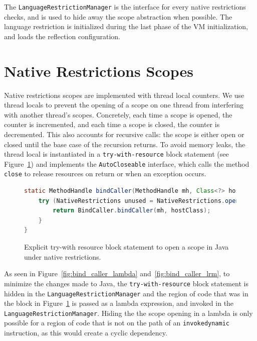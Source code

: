 The \verb|LanguageRestrictionManager| is the interface for every native restrictions checks, and is used to hide away the scope abstraction when possible.
The language restriction is initialized during the last phase of the VM initialization, and loads the reflection configuration.
\section{Native Restrictions Scopes}
Native restrictions scopes are implemented with thread local counters. We use thread locals to prevent the opening of a scope on one thread from interfering with another thread's scopes.
Concretely, each time a scope is opened, the counter is incremented, and each time a scope is closed, the counter is decremented. This also accounts for recursive calls: the scope is either open or closed until the base case of the recursion returns.
To avoid memory leaks, the thread local is instantiated in a \verb|try-with-resource| block statement (see Figure~\ref{fig:bind_caller_twr}) and implements the \verb|AutoCloseable| interface, which calls the method \verb|close| to release resources on return or when an exception occurs.

\begin{figure}[ht]
    \centering
\begin{lstlisting}[language=Java]
static MethodHandle bindCaller(MethodHandle mh, Class<?> hostClass) {
    try (NativeRestrictions unused = NativeRestrictions.openScope()) {
        return BindCaller.bindCaller(mh, hostClass);
    }
}
\end{lstlisting}
    \caption{Explicit try-with resource block statement to open a scope in Java under native restrictions.}
    \label{fig:bind_caller_twr}
\end{figure}

As seen in Figure~\ref{fig:bind_caller_lambda} and~\ref{fig:bind_caller_lrm}, to minimize the changes made to Java, the \verb|try-with-resource| block statement is hidden in the \verb|LanguageRestrictionManager| and the region of code that was in the block in Figure~\ref{fig:bind_caller_twr} is passed as a lambda expression, and invoked in the \verb|LanguageRestrictionManager|. Hiding the the scope opening in a lambda is only possible for a region of code that is not on the path of an \verb|invokedynamic| instruction, as this would create a cyclic dependency. 

